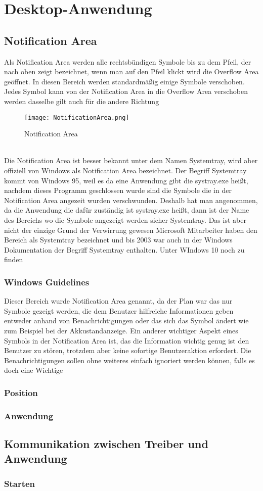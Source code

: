 \chapter{Desktop-Anwendung}
\label{chap:DesktopAnwendung}

\section{Notification Area}
Als Notification Area werden alle rechtsbündigen Symbole bis zu dem Pfeil, der nach oben zeigt bezeichnet, wenn man auf den Pfeil klickt wird die Overflow Area geöffnet. In diesen Bereich werden standardmäßig einige Symbole verschoben. Jedes Symbol kann von der Notification Area in die Overflow Area verschoben werden dasselbe gilt auch für die andere Richtung
\begin{figure}[H]
    \centering
    \texttt{[image: NotificationArea.png]}
    \caption[NotificationArea]{Notification Area} 
\end{figure}
\  \\
Die Notification Area ist besser bekannt unter dem Namen Systemtray, wird aber offiziell von Windows als Notification Area bezeichnet. Der Begriff Systemtray kommt von Windows 95, weil es da eine Anwendung gibt die systray.exe heißt, nachdem dieses Programm geschlossen wurde sind die Symbole die in der Notification Area angezeit wurden verschwunden. Deshalb hat man angenommen, da die Anwendung die dafür zuständig ist systray.exe heißt, dann ist der Name des Bereichs wo die Symbole angezeigt werden sicher Systemtray. Das ist aber nicht der einzige Grund der Verwirrung gewesen Microsoft Mitarbeiter haben den Bereich als Systemtray bezeichnet und bis 2003 war auch in der Windows Dokumentation der Begriff Systemtray enthalten. Unter WIndows 10 noch zu finden

\subsection{Windows Guidelines}
Dieser Bereich wurde Notification Area genannt, da der Plan war das nur Symbole gezeigt werden, die dem Benutzer hilfreiche Informationen geben entweder anhand von Benachrichtigungen oder das sich das Symbol ändert wie zum Beispiel bei der Akkustandanzeige. Ein anderer wichtiger Aspekt eines Symbols in der Notification Area ist, das die Information wichtig genug ist den Benutzer zu stören, trotzdem aber keine sofortige  Benutzeraktion erfordert. Die Benachrichtigungen sollen ohne weiteres einfach ignoriert werden können, falls es doch eine Wichtige 

\subsection{Position}

\subsection{Anwendung}

\section{Kommunikation zwischen Treiber und Anwendung}
\subsection{Starten}